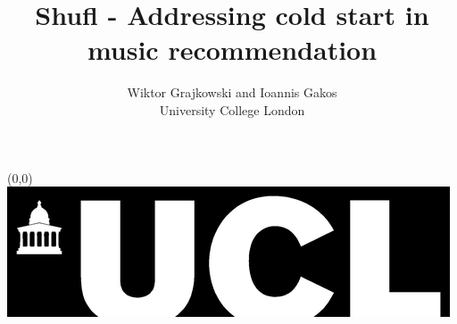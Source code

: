 \documentclass[a0]{a0poster}
\title{Shufl - Addressing cold start in music recommendation}
\author{Wiktor Grajkowski and Ioannis Gakos\\ University College London}
\begin{document}
  \begin{textblock}{23}(0,0)
  \vspace*{-48mm}\hspace*{-42mm}%
  \includegraphics{ucl_bar_black.eps}
  \begin{minipage}{1191mm}		%
  \vspace{-20cm}
  \maketitle
  \end{minipage}
  \end{textblock}

\end{document}
